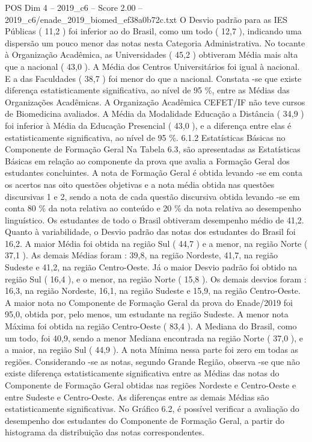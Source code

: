 \begin{textsample}{POS Dim 4 – 2019\_c6 – Score 2.00 – 2019\_c6/enade\_2019\_biomed\_ef38a0b72c.txt}
O Desvio padrão para as IES Públicas ( 11,2 ) foi inferior ao do Brasil, como um todo ( 12,7 ), indicando uma dispersão um pouco menor das notas nesta Categoria Administrativa.
No tocante à Organização Acadêmica, as Universidades ( 45,2 ) obtiveram Média mais alta que a nacional ( 43,0 ).
A Média dos Centros Universitários foi igual à nacional.
E a das Faculdades ( 38,7 ) foi menor do que a nacional.
Constata -se que existe diferença estatisticamente significativa, ao nível de 95 \%, entre as Médias das Organizações Acadêmicas.
A Organização Acadêmica CEFET/IF não teve cursos de Biomedicina avaliados.
A Média da Modalidade Educação a Distância ( 34,9 ) foi inferior à Média da Educação Presencial ( 43,0 ), e a diferença entre elas é estatisticamente significativa, ao nível de 95 \%. 6.1.2 Estatísticas Básicas no Componente de Formação Geral Na Tabela 6.3, são apresentadas as Estatísticas Básicas em relação ao componente da prova que avalia a Formação Geral dos estudantes concluintes.
A nota de Formação Geral é obtida levando -se em conta os acertos nas oito questões objetivas e a nota média obtida nas questões discursivas 1 e 2, sendo a nota de cada questão discursiva obtida levando -se em conta 80 \% da nota relativa ao conteúdo e 20 \% da nota relativa ao desempenho linguístico.
Os estudantes de todo o Brasil obtiveram desempenho médio de 41,2.
Quanto à variabilidade, o Desvio padrão das notas dos estudantes do Brasil foi 16,2.
A maior Média foi obtida na região Sul ( 44,7 ) e a menor, na região Norte ( 37,1 ).
As demais Médias foram : 39,8, na região Nordeste, 41,7, na região Sudeste e 41,2, na região Centro-Oeste.
Já o maior Desvio padrão foi obtido na região Sul ( 16,4 ), e o menor, na região Norte ( 15,8 ).
Os demais desvios foram : 16,3, na região Nordeste, 16,1, na região Sudeste e 15,9, na região Centro-Oeste.
A maior nota no Componente de Formação Geral da prova do Enade/2019 foi 95,0, obtida por, pelo menos, um estudante na região Sudeste.
A menor nota Máxima foi obtida na região Centro-Oeste ( 83,4 ).
A Mediana do Brasil, como um todo, foi 40,9, sendo a menor Mediana encontrada na região Norte ( 37,0 ), e a maior, na região Sul ( 44,9 ).
A nota Mínima nessa parte foi zero em todas as regiões.
Considerando -se as notas, segundo Grande Região, observa -se que não existe diferença estatisticamente significativa entre as Médias das notas do Componente de Formação Geral obtidas nas regiões Nordeste e Centro-Oeste e entre Sudeste e Centro-Oeste.
As diferenças entre as demais Médias são estatisticamente significativas.
No Gráfico 6.2, é possível verificar a avaliação do desempenho dos estudantes do Componente de Formação Geral, a partir do histograma da distribuição das notas correspondentes.

\end{textsample}
